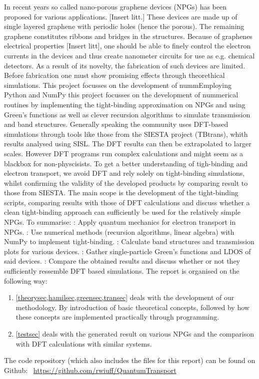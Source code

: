 In recent years so called nano-porous graphene devices (NPGs) has been proposed for various applications. [Insert litt.] These devices are made up of single layered graphene with periodic holes (hence the porous). The remaining graphene constitutes ribbons and bridges in the structures. Because of graphenes electrical properties [Insert litt], one should be able to finely control the electron currents in the devices and thus create nanometer circuits for use as e.g. chemical detectors. As a result of its novelty, the fabrication of such devices are limited. Before fabrication one must show promising effects through theorethical simulations.\newline
This project focusses on the development of nummEmploying Python and NumPy this project focusses on the development of nummerical routines by implementing the tight-binding approximation on NPGs and using Green's functions as well as clever recursion algorithms to simulate transmission and band structures.\newline
Generally speaking the community uses DFT-based simulations through tools like those from the SIESTA project (TBtrans), whith results analysed using SISL\cite{zerothi_sisl}. The DFT results can then be extrapolated to larger scales\cite{calogero_electron_2019}. However DFT programs run complex calculations and might seem as a blackbox for non-physcisists. To get a better understanding of tigh-binding and electron transport, we avoid DFT and rely solely on tight-binding simulations, whilst confirming the validity of the developed products by comparing result to those from SIESTA.\newline
The main scope is the development of the tight-binding scripts, comparing results with those of DFT calculations and discuss whether a clean tight-binding approach can sufficiently be used for the relatively simple NPGs.\newline
To summarise:\newline
{}: Apply quantum mechanics for electron transport in NPGs. : Use numerical methods (recursion algorithms, linear algebra) with NumPy to implement tight-binding. : Calculate band structures and transmission plots for various devices. : Gather single-particle Green’s functions and LDOS of said devices. : Compare the obtained results and discuss whether or not they sufficiently ressemble DFT based simulations.
The report is organised on the following way:
\begin{enumerate}
    \item \cref{theorysec,hamilsec,greensec,transec} deals with the development of our methodology. By introduction of basic theoretical concepts, followed by how these concepts are implemented practically through programming. 
    \item \cref{testsec} deals with the generated result on various NPGs and the comparison with DFT calculations with similar systems.
\end{enumerate}
The code repository (which also includes the \latex files for this report) can be found on Github: \faGithub \ \url{https://github.com/rwiuff/QuantumTransport}
